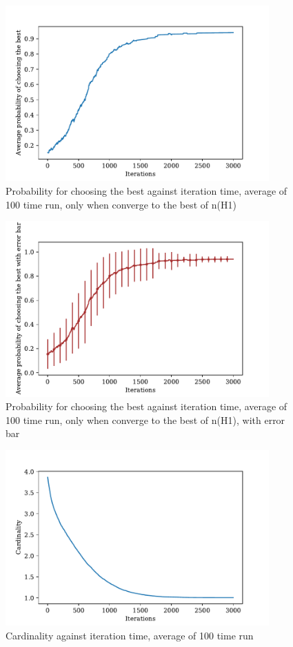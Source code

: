\documentclass[a4paper,12pt]{article}
\begin{document}
	\begin{figure}[H]
		\centering
		\includegraphics[width=0.9\textwidth]{correct_pbestnorm1_200_3000_100}
		\caption{Probability for choosing the best against iteration time, average of 100 time run, only when converge to the best of n(H1)}\label{correct_pbestnorm1_200_3000_100}
	\end{figure}
	\begin{figure}[H]
		\centering
		\includegraphics[width=0.9\textwidth]{correct_pbest_errbarnorm1_200_3000_100}
		\caption{Probability for choosing the best against iteration time, average of 100 time run, only when converge to the best of n(H1), with error bar}\label{correct_pbest_errbarnorm1_200_3000_100}
	\end{figure}
	\begin{figure}[H]
		\centering
		\includegraphics[width=0.9\textwidth]{cardnorm1_200_3000_100}
		\caption{Cardinality against iteration time, average of 100 time run}\label{cardnorm1_200_3000_100}
	\end{figure}
\end{document}

